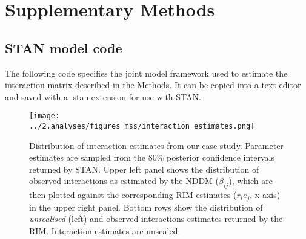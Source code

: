 \documentclass[a4,12pt]{article}
\begin{document}
    

% 
% 

\newpage

\printbibliography   

\newpage 

\section{Supplementary Methods}

    \subsection{STAN model code}

    The following code specifies the joint model framework used to estimate the interaction matrix described in the Methods. It can be copied into a text editor and saved with a .stan extension for use with STAN. 

    




    \begin{figure}[H]
        \texttt{[image: ../2.analyses/figures\_mss/interaction\_estimates.png]}
        \caption{Distribution of interaction estimates from our case study. Parameter estimates are sampled from the 80\% posterior confidence intervals returned by STAN. Upper left panel shows the distribution of observed interactions as estimated by the NDDM ($\beta_{ij}$), which are then plotted against the corresponding RIM estimates ($r_i e_j$, x-axis) in the upper right panel. Bottom rows show the distribution of \textit{unrealised} (left) and observed interactions estimates returned by the RIM. Interaction estimates are unscaled.}
        \label{fig:adist}
    \end{figure}

\end{document}
